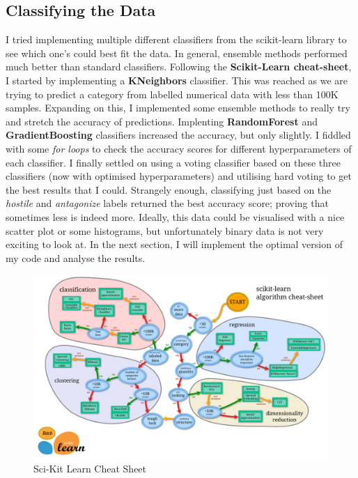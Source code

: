 \documentclass[11pt]{article}
\begin{document}
\subsection{Classifying the Data}
\label{sec:org259bc97}

I tried implementing multiple different classifiers from the scikit-learn library to see which one's could best fit the data. 
In general, ensemble methods performed much better than standard classifiers.
Following the \textbf{Scikit-Learn cheat-sheet}, I started by implementing a \textbf{KNeighbors} classifier.
This was reached as we are trying to predict a category from labelled numerical data with less than 100K samples.
Expanding on this, I implemented some ensemble methods to really try and stretch the accuracy of predictions.
Implenting \textbf{RandomForest} and \textbf{GradientBoosting} classifiers increased the accuracy, but only slightly.
I fiddled with some \emph{for loops} to check the accuracy scores for different hyperparameters of each classifier.
I finally settled on using a voting classifier based on these three classifiers (now with optimised hyperparameters) and utilising hard voting to get the best results that I could.
Strangely enough, classifying just based on the \emph{hostile} and \emph{antagonize} labels returned the best accuracy score; proving that sometimes less is indeed more.
Ideally, this data could be visualised with a nice scatter plot or some histograms, but unfortunately binary data is not very exciting to look at.
In the next section, I will implement the optimal version of my code and analyse the results.

\begin{figure}[H]
\centering
\includegraphics[width=.9\linewidth]{ml_map.png}
\caption{Sci-Kit Learn Cheat Sheet}
\end{figure}
\end{document}
